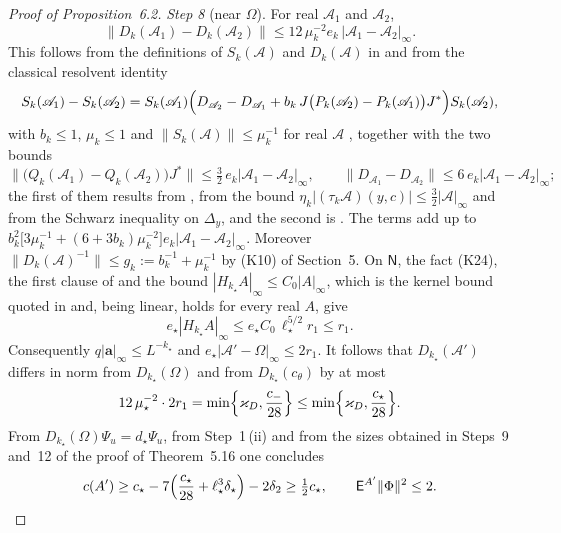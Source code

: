 \documentclass[11pt,letterpaper,reqno]{amsart}
\theoremstyle{definition}
\begin{document}
\begin{proof}[Proof of Proposition~6.2]
\emph{Step 8} (near $\Omega$).
For real $\mathscr A_1$ and $\mathscr A_2$,
\begin{equation*}
\|D_k(\mathscr A_1)-D_k(\mathscr A_2)\|\le12\,\mu_k^{-2}e_k\,|\mathscr A_1-\mathscr A_2|_\infty .
\end{equation*}
This follows from the definitions of $S_k(\mathscr A)$ and $D_k(\mathscr A)$ in \cite[Section~I.3.5]{QEDIII} and from the classical resolvent identity
\begin{equation*}
S_k(\mathscr A_1)-S_k(\mathscr A_2)=S_k(\mathscr A_1)\Bigl(D_{\mathscr A_2}-D_{\mathscr A_1}+b_k\,J\bigl(P_k(\mathscr A_2)-P_k(\mathscr A_1)\bigr)J^*\Bigr)S_k(\mathscr A_2),
\end{equation*}
with $b_k\le1$, $\mu_k\le1$ and $\|S_k(\mathscr A)\|\le\mu_k^{-1}$ for real $\mathscr A$ \cite[(I.O2), (I.Q2)]{QEDIII}, together with the two bounds
\begin{equation*}
\bigl\|\bigl(Q_k(\mathscr A_1)-Q_k(\mathscr A_2)\bigr)J^*\bigr\|\le\tfrac32\,e_k|\mathscr A_1-\mathscr A_2|_\infty,\qquad\|D_{\mathscr A_1}-D_{\mathscr A_2}\|\le6\,e_k|\mathscr A_1-\mathscr A_2|_\infty;
\end{equation*}
the first of them results from \cite[(I.3.3)]{QEDIII}, from the bound $\eta_k|(\tau_k\mathscr A)(y,c)|\le\frac32|\mathscr A|_\infty$ \cite[Section~I.9.2, Lemma (Bound for the axial functional)]{QEDIII} and from the Schwarz inequality on $\Delta_y$, and the second is \cite[(I.O6)]{QEDIII}.
The terms add up to $b_k^2\bigl[3\mu_k^{-1}+(6+3b_k)\mu_k^{-2}\bigr]e_k|\mathscr A_1-\mathscr A_2|_\infty$.
Moreover $\|D_k(\mathscr A)^{-1}\|\le g_k:=b_k^{-1}+\mu_k^{-1}$ by (K10) of Section~5.
On $\mathsf N$, the fact (K24), the first clause of \cite[(T2)]{QEDIII} and the bound $|H_{k_\star}A|_\infty\le C_0|A|_\infty$, which is the kernel bound quoted in \cite[(32.8)]{QEDIII} and, being linear, holds for every real $A$, give
\begin{equation*}
e_\star|H_{k_\star}A|_\infty\le e_\star C_0\,\ell_\star^{5/2}r_1\le r_1 .
\end{equation*}
Consequently $q|\mathbf a|_\infty\le L^{-k_\star}$ and $e_\star|\mathscr A'-\Omega|_\infty\le2r_1$.
It follows that $D_{k_\star}(\mathscr A')$ differs in norm from $D_{k_\star}(\Omega)$ and from $D_{k_\star}(c_\theta)$ by at most
\begin{equation*}
12\,\mu_\star^{-2}\cdot2r_1=\min\Bigl\{\varkappa_D,\frac{c_-}{28}\Bigr\}\le\min\Bigl\{\varkappa_D,\frac{c_\star}{28}\Bigr\}.
\end{equation*}
From $D_{k_\star}(\Omega)\Psi_u=d_\star\Psi_u$, from Step~1\,(ii) and from the sizes obtained in Steps~9 and~12 of the proof of Theorem~5.16 one concludes
\begin{equation*}
c(A')\ge c_\star-7\Bigl(\frac{c_\star}{28}+\ell_\star^3\delta_\star\Bigr)-2\delta_2\ge\tfrac12c_\star,\qquad\mathsf E^{A'}\|\Phi\|^2\le2 .
\end{equation*}


\end{proof}
\end{document}
